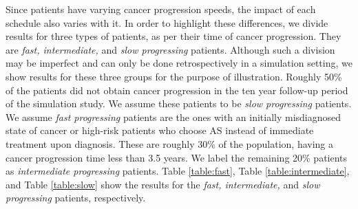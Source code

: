 Since patients have varying cancer progression speeds, the impact of each schedule also varies with it. In order to highlight these differences, we divide results for three types of patients, as per their time of cancer progression. They are \textit{fast, intermediate,} and \textit{slow progressing} patients. Although such a division may be imperfect and can only be done retrospectively in a simulation setting, we show results for these three groups for the purpose of illustration. Roughly 50\% of the patients did not obtain cancer progression in the ten year follow-up period of the simulation study. We assume these patients to be \textit{slow progressing} patients. We assume \textit{fast progressing} patients are the ones with an initially misdiagnosed state of cancer \citep{cooperberg2011outcomes} or high-risk patients who choose AS instead of immediate treatment upon diagnosis. These are roughly 30\% of the population, having a cancer progression time less than 3.5 years. We label the remaining 20\% patients as \textit{intermediate progressing} patients. Table \ref{table:fast}, Table \ref{table:intermediate}, and Table \ref{table:slow} show the results for the \textit{fast, intermediate,} and \textit{slow progressing} patients, respectively.

